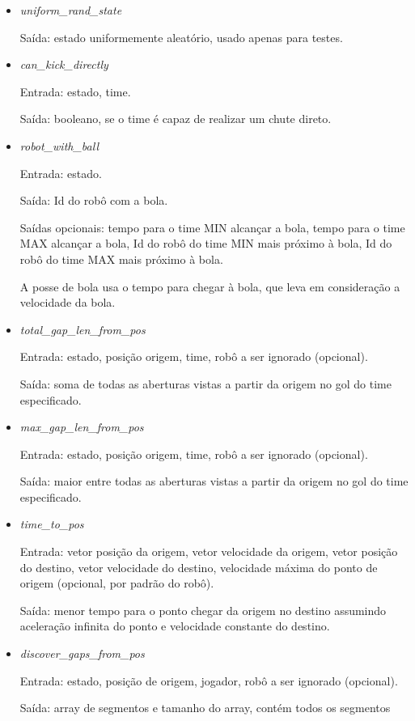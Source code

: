 \begin{itemize}
  \item \textit{uniform_rand_state}
    \par Saída: estado uniformemente aleatório, usado apenas para testes.
  \item \textit{can_kick_directly}
    \par Entrada: estado, time.
    \par Saída: booleano, se o time é capaz de realizar um chute direto.
  \item \textit{robot_with_ball}
    \par Entrada: estado.
    \par Saída: Id do robô com a bola.
    \par Saídas opcionais: tempo para o time MIN alcançar a bola, tempo para o
    time MAX alcançar a bola, Id do robô do time MIN mais próximo à bola, Id do
    robô do time MAX mais próximo à bola.
    \par A posse de bola usa o tempo para chegar à bola, que leva em
    consideração a velocidade da bola.
  \item \textit{total_gap_len_from_pos}
    \par Entrada: estado, posição origem, time, robô a ser ignorado (opcional).
    \par Saída: soma de todas as aberturas vistas a partir da origem no gol do
    time especificado.
  \item \textit{max_gap_len_from_pos}
    \par Entrada: estado, posição origem, time, robô a ser ignorado (opcional).
    \par Saída: maior entre todas as aberturas vistas a partir da origem no gol do
    time especificado.
  \item \textit{time_to_pos}
    \par Entrada: vetor posição da origem, vetor velocidade da origem, vetor posição
    do destino, vetor velocidade do destino, velocidade máxima do ponto de
    origem (opcional, por padrão do robô).
    \par Saída: menor tempo para o ponto chegar da origem no destino assumindo
    aceleração infinita do ponto e velocidade constante do destino.
  \item \textit{discover_gaps_from_pos}
    \par Entrada: estado, posição de origem, jogador, robô a ser ignorado
    (opcional).
    \par Saída: array de segmentos e tamanho do array, contém todos os segmentos

\end{itemize}
